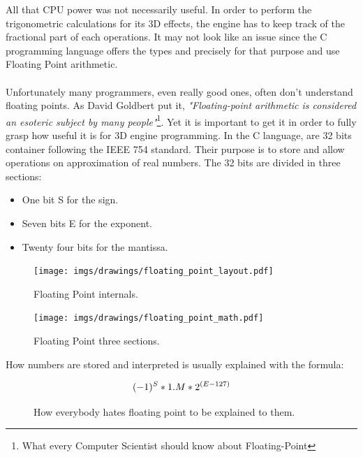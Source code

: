\documentclass[book.tex]{subfiles}
\begin{document}
   All that CPU power was not necessarily useful. In order to perform the trigonometric calculations for its 3D effects, the engine has to keep track of the fractional part of each operations. It may not look like an issue since the C programming language offers the types  and  precisely for that purpose and use Floating Point arithmetic.\\
\\
Unfortunately many programmers, even really good ones, often don't understand floating points. As David Goldbert put it, \emph{"Floating-point arithmetic is considered an esoteric subject by many people"}\footnote{What every Computer Scientist should know about Floating-Point}. Yet it is  important to get it in order to fully grasp how useful it is for 3D engine programming. In the C language,  are 32 bits container following the IEEE 754 standard. Their purpose is to store and allow operations on approximation of real numbers. The 32 bits are divided in three sections:\\
\begin{itemize}
  \item One bit S for the sign.
  \item Seven bits E for the exponent.
  \item Twenty four bits for the mantissa.
\end{itemize} 

\begin{figure}[H]
\centering
\texttt{[image: imgs/drawings/floating\_point\_layout.pdf]}
\caption{Floating Point internals.}
\end{figure}
  \bigskip



\begin{figure}[H]
\centering
\texttt{[image: imgs/drawings/floating\_point\_math.pdf]}
\caption{Floating Point three sections.}
\end{figure}
  \bigskip  


How numbers are stored and interpreted is usually explained with the formula:\\
\par
\begin{figure}[H]
\begin{equation}\label{eq:fp}
\large
(-1)^S * 1.M * 2^{(E-127)}
\end{equation}
 \caption{How everybody hates floating point to be explained to them.}
\end{figure}
\bigskip  
\end{document}
